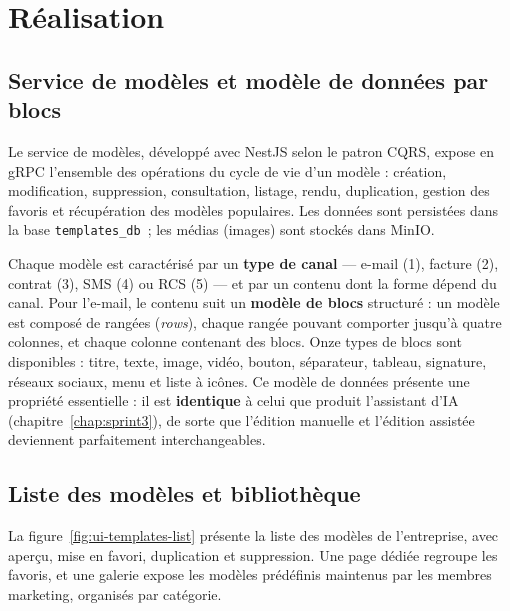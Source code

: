 
\section{Réalisation}

\subsection{Service de modèles et modèle de données par blocs}
Le service de modèles, développé avec NestJS selon le patron CQRS, expose en
gRPC l'ensemble des opérations du cycle de vie d'un modèle : création,
modification, suppression, consultation, listage, rendu, duplication,
gestion des favoris et récupération des modèles populaires. Les données sont
persistées dans la base \texttt{templates\_db}~; les médias (images) sont
stockés dans MinIO.

Chaque modèle est caractérisé par un \textbf{type de canal} — e-mail (1),
facture (2), contrat (3), SMS (4) ou RCS (5) — et par un contenu dont la
forme dépend du canal. Pour l'e-mail, le contenu suit un
\textbf{modèle de blocs} structuré : un modèle est composé de rangées
(\emph{rows}), chaque rangée pouvant comporter jusqu'à quatre colonnes, et
chaque colonne contenant des blocs. Onze types de blocs sont disponibles :
titre, texte, image, vidéo, bouton, séparateur, tableau, signature, réseaux
sociaux, menu et liste à icônes. Ce modèle de données présente une propriété
essentielle : il est \textbf{identique} à celui que produit l'assistant
d'IA (chapitre~\ref{chap:sprint3}), de sorte que l'édition manuelle et
l'édition assistée deviennent parfaitement interchangeables.

\subsection{Liste des modèles et bibliothèque}
La figure~\ref{fig:ui-templates-list} présente la liste des modèles de
l'entreprise, avec aperçu, mise en favori, duplication et suppression. Une
page dédiée regroupe les favoris, et une galerie expose les modèles
prédéfinis maintenus par les membres marketing, organisés par catégorie.


